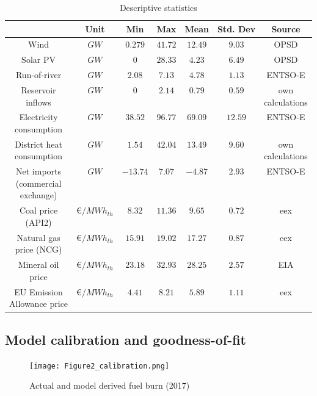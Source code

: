 \documentclass[preprint, 12pt, authoryear]{elsarticle}
\begin{document}
\begin{table}[t!]
\caption{Descriptive statistics}
\smallskip
\centering
\begin{tabular}{c c c c c c c}
\hline
 & Unit & Min & Max & Mean & Std. Dev & Source \\ \hline \hline
Wind & $GW$ & $0.279$ & $41.72$ & $12.49$ & $9.03$ & OPSD \\ \hline
Solar PV & $GW$ & $0$ & $28.33$ & $4.23$ & $6.49$ & OPSD \\ \hline
Run-of-river & $GW$ & $2.08$ & $7.13$ & $4.78$ & $1.13$ & ENTSO-E \\ \hline
\makecell{Reservoir \\ inflows} & $GW$ & $0$ & $2.14$ & $0.79$ & $0.59$ & \makecell{own\\ calculations} \\ \hline
\makecell{Electricity \\consumption} & $GW$ & $38.52$ & $96.77$ & $69.09$ & $12.59$ & ENTSO-E \\ \hline
\makecell{District heat \\ consumption} & $GW$ & $1.54$ & $42.04$ & $13.49$ & $9.60$ & \makecell{own \\calculations} \\ \hline
\makecell{Net imports \\ (commercial \\exchange)} & $GW$ & $-13.74$ & $7.07$ & $-4.87$ & $2.93$ & ENTSO-E\\ \hline
\makecell{Coal price \\(API2)} & \euro{}$/MWh_{th}$ & $8.32$ & $11.36$ & $9.65$ & $0.72$ & eex \\ \hline
\makecell{Natural gas \\price (NCG)} & \euro{}$/MWh_{th}$ & $15.91$ & $19.02$ & $17.27$ & $0.87$ & eex\\ \hline
\makecell{Mineral oil \\price} & \euro{}$/MWh_{th}$ & $23.18$ & $32.93$ & $28.25$ & $2.57$ & EIA\\ \hline
\makecell{EU Emission \\Allowance price} & \euro{}$/MWh_{th}$ & $4.41$ & $8.21$ & $5.89$ & $1.11$ & eex\\
\hline \hline
\end{tabular}
\label{Tab2}
\end{table}

\subsection{Model calibration and goodness-of-fit}
\begin{figure}[t]
\centering
\texttt{[image: Figure2\_calibration.png]}
\caption{Actual and model derived fuel burn (2017)}\label{Fig2}
\end{figure}
\end{document}
